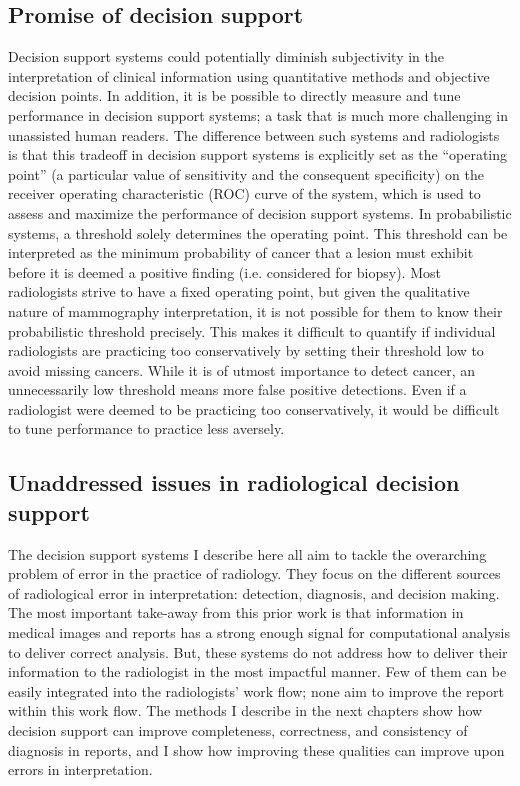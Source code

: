 \subsection{Promise of decision support}
Decision support systems could potentially diminish subjectivity in the interpretation of clinical information using quantitative methods and objective decision points. In addition, it is be possible to directly measure and tune performance in decision support systems; a task that is much more challenging in unassisted human readers. The difference between such systems and radiologists is that this tradeoff in decision support systems is explicitly set as the ``operating point'' (a particular value of sensitivity and the consequent specificity) on the receiver operating characteristic (ROC) curve of the system, which is used to assess and maximize the performance of decision support systems. In probabilistic systems, a threshold solely determines the operating point. This threshold can be interpreted as the minimum probability of cancer that a lesion must exhibit before it is deemed a positive finding (i.e. considered for biopsy). Most radiologists strive to have a fixed operating point, but given the qualitative nature of mammography interpretation, it is not possible for them to know their probabilistic threshold precisely. This makes it difficult to quantify if individual radiologists are practicing too conservatively by setting their threshold low to avoid missing cancers. While it is of utmost importance to detect cancer, an unnecessarily low threshold means more false positive detections. Even if a radiologist were deemed to be practicing too conservatively, it would be difficult to tune performance to practice less aversely.

\subsection{Unaddressed issues in radiological decision support}
The decision support systems I describe here all aim to tackle the overarching problem of error in the practice of radiology.
They focus on the different sources of radiological error in interpretation: detection, diagnosis, and decision making.
The most important take-away from this prior work is that information in medical images and reports has a strong enough signal for computational analysis to deliver correct analysis.
But, these systems do not address how to deliver their information to the radiologist in the most impactful manner.
Few of them can be easily integrated into the radiologists' work flow; none aim to improve the report within this work flow.
The methods I describe in the next chapters show how decision support can improve completeness, correctness, and consistency of diagnosis in reports, and I show how improving these qualities can improve upon errors in interpretation.









